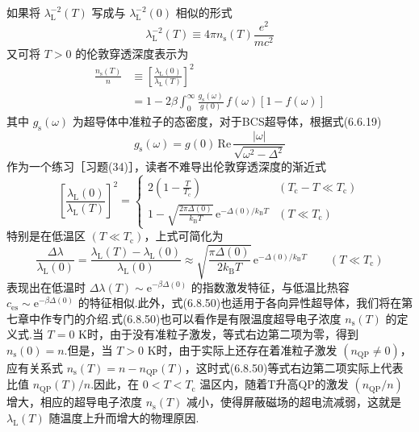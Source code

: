如果将 $\lambda_{\mathrm{L}}^{-2}(T)$ 写成与 $\lambda_{\mathrm{L}}^{-2}(0)$ 相似的形式
\begin{equation*}
  \lambda_{\mathrm{L}}^{-2}(T)\equiv 4\pi n_{\mathrm{s}}(T)\frac{e^{2}}{mc^{2}}
\end{equation*}
又可将 $T>0$ 的伦敦穿透深度表示为
\begin{equation}
\begin{aligned}
  \frac{n_{\mathrm{s}}(T)}{n}
  &\equiv\left[\frac{\lambda_{\mathrm{L}}(0)}{\lambda_{\mathrm{L}}(T)}\right]^{2}\\
  &=1-2\beta\int_{0}^{\infty}\frac{g_{\mathrm{s}}(\omega)}{g(0)}\,
  f(\omega)\left[1-f(\omega)\right]
\end{aligned}
\end{equation}
其中 $g_{\mathrm{s}}(\omega)$ 为超导体中准粒子的态密度，对于BCS超导体，根据式(6.6.19)
\begin{equation*}
  g_{\mathrm{s}}(\omega)=g(0)\,\mathrm{Re}\,
  \frac{|\omega|}{\sqrt{\omega^{2}-\Delta^{2}}}
\end{equation*}
作为一个练习［习题(34)］，读者不难导出伦敦穿透深度的渐近式
\begin{equation}
  \left[\frac{\lambda_{\mathrm{L}}(0)}{\lambda_{\mathrm{L}}(T)}\right]^{2}
  =\begin{cases}
    \displaystyle 2\left(1-\frac{T}{T_{\mathrm{c}}}\right)
    & \left(T_{\mathrm{c}}-T\ll T_{\mathrm{c}}\right)\\[1em]
    \displaystyle 1-\sqrt{\frac{2\pi\Delta(0)}{k_{\mathrm{B}}T}}\,
    \mathrm{e}^{-\Delta(0)/k_{\mathrm{B}}T}
    & \left(T\ll T_{\mathrm{c}}\right)
  \end{cases}
\end{equation}
特别是在低温区 $\left(T\ll T_{\mathrm{c}}\right)$，上式可简化为
\begin{equation}
  \frac{\Delta\lambda}{\lambda_{\mathrm{L}}(0)}
  =\frac{\lambda_{\mathrm{L}}(T)-\lambda_{\mathrm{L}}(0)}{\lambda_{\mathrm{L}}(0)}
  \approx\sqrt{\frac{\pi\Delta(0)}{2k_{\mathrm{B}}T}}\,
  \mathrm{e}^{-\Delta(0)/k_{\mathrm{B}}T}
  \qquad(T\ll T_{\mathrm{c}})
\end{equation}
表现出在低温时 $\Delta\lambda(T)\sim\mathrm{e}^{-\beta\Delta(0)}$ 的指数激发特征，与低温比热容 $c_{\mathrm{es}}\sim\mathrm{e}^{-\beta\Delta(0)}$ 的特征相似.此外，式(6.8.50)也适用于各向异性超导体，我们将在第七章中作专门的介绍.式(6.8.50)也可以看作是有限温度超导电子浓度 $n_{\mathrm{s}}(T)$ 的定义式.当 $T=0$ K时，由于没有准粒子激发，等式右边第二项为零，得到 $n_{\mathrm{s}}(0)=n$.但是，当 $T>0$ K时，由于实际上还存在着准粒子激发 $\left(n_{\mathrm{QP}}\neq0\right)$，应有关系式 $n_{\mathrm{s}}(T)=n-n_{\mathrm{QP}}(T)$，这时式(6.8.50)等式右边第二项实际上代表比值 $n_{\mathrm{QP}}(T)/n$.因此，在 $0<T<T_{\mathrm{c}}$ 温区内，随着T升高QP的激发 $\left(n_{\mathrm{QP}}/n\right)$ 增大，相应的超导电子浓度 $n_{\mathrm{s}}(T)$ 减小，使得屏蔽磁场的超电流减弱，这就是 $\lambda_{\mathrm{L}}(T)$ 随温度上升而增大的物理原因.


